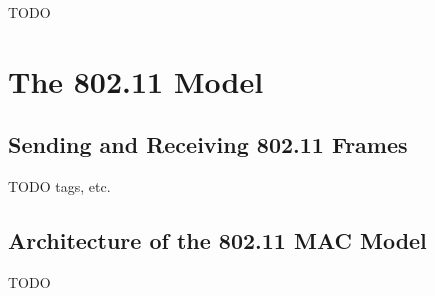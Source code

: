 \ifdraft TODO

\chapter{The 802.11 Model}
\label{cha:80211}


\section{Sending and Receiving 802.11 Frames}

TODO tags, etc.

\section{Architecture of the 802.11 MAC Model}

TODO

\fi



